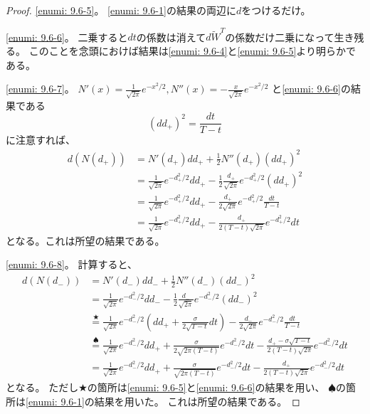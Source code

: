 \documentclass[uplatex]{jsarticle}
\theoremstyle{definition}
\begin{document}
\begin{proof}
  \ref{enumi: 9.6-5}。
  \ref{enumi: 9.6-1}の結果の両辺に\(d\)をつけるだけ。

  \ref{enumi: 9.6-6}。
  二乗すると\(dt\)の係数は消えて\(d\tilde{W}^T\)の係数だけ二乗になって生き残る。
  このことを念頭におけば結果は\ref{enumi: 9.6-4}と\ref{enumi: 9.6-5}より明らかである。

  \ref{enumi: 9.6-7}。
  \(N'(x) = \frac{1}{\sqrt{2\pi}}e^{-x^2/2},
  N''(x) = -\frac{x}{\sqrt{2\pi}}e^{-x^2/2}\)
  と\ref{enumi: 9.6-6}の結果である
  \[(dd_+)^2 = \frac{dt}{T-t}\]
  に注意すれば、
  \begin{align*}
    d\left( N(d_+)\right)
    &= N'(d_+)dd_+ + \frac{1}{2}N''(d_+)(dd_+)^2 \\
    &= \frac{1}{\sqrt{2\pi}}e^{-d_+^2/2}dd_+
    - \frac{1}{2}\frac{d_+}{\sqrt{2\pi}}e^{-d_+^2/2}(dd_+)^2 \\
    &= \frac{1}{\sqrt{2\pi}}e^{-d_+^2/2}dd_+
    - \frac{d_+}{2\sqrt{2\pi}}e^{-d_+^2/2}\frac{dt}{T-t} \\
    &= \frac{1}{\sqrt{2\pi}}e^{-d_+^2/2}dd_+
    - \frac{d_+}{2(T-t)\sqrt{2\pi}}e^{-d_+^2/2}dt
  \end{align*}
  となる。これは所望の結果である。

  \ref{enumi: 9.6-8}。
  計算すると、
  \begin{align*}
    d\left( N(d_-)\right)
    &= N'(d_-)dd_- + \frac{1}{2}N''(d_-)(dd_-)^2 \\
    &= \frac{1}{\sqrt{2\pi}}e^{-d_-^2/2}dd_-
    - \frac{1}{2}\frac{d_-}{\sqrt{2\pi}}e^{-d_-^2/2}(dd_-)^2 \\
    &\overset{\bigstar}{=}
    \frac{1}{\sqrt{2\pi}}e^{-d_-^2/2}
    \left( dd_+ + \frac{\sigma}{2\sqrt{T-t}}dt\right)
    - \frac{d_-}{2\sqrt{2\pi}}e^{-d_-^2/2}\frac{dt}{T-t} \\
    &\overset{\spadesuit}{=}
    \frac{1}{\sqrt{2\pi}}e^{-d_-^2/2}dd_+
    + \frac{\sigma}{2\sqrt{2\pi(T-t)}}e^{-d_-^2/2}dt
    - \frac{d_+ - \sigma\sqrt{T-t}}{2(T-t)\sqrt{2\pi}}e^{-d_-^2/2}dt \\
    &= \frac{1}{\sqrt{2\pi}}e^{-d_-^2/2}dd_+
    + \frac{\sigma}{\sqrt{2\pi(T-t)}}e^{-d_-^2/2}dt
    - \frac{d_+}{2(T-t)\sqrt{2\pi}}e^{-d_-^2/2}dt
  \end{align*}
  となる。
  ただし\(\bigstar\)の箇所は\ref{enumi: 9.6-5}と\ref{enumi: 9.6-6}の結果を用い、
  \(\spadesuit\)の箇所は\ref{enumi: 9.6-1}の結果を用いた。
  これは所望の結果である。


\end{proof}
\end{document}
